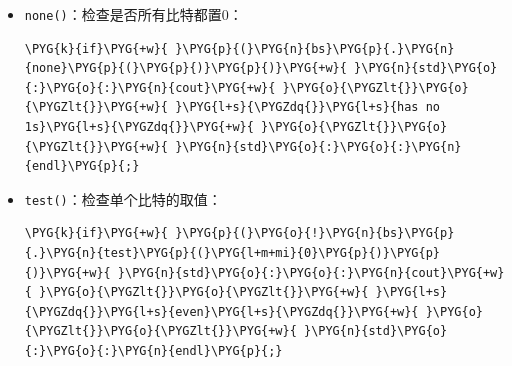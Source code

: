 \begin{itemize}
\begin{codeblockbg}
\begin{Verbatim}[commandchars=\\\{\},breaklines=true,breakanywhere=true,fontsize=\codefont,xleftmargin=17bp]
\PYG{k}{if}\PYG{+w}{ }\PYG{p}{(}\PYG{n}{bs}\PYG{p}{.}\PYG{n}{all}\PYG{p}{(}\PYG{p}{)}\PYG{p}{)}\PYG{+w}{ }\PYG{n}{std}\PYG{o}{:}\PYG{o}{:}\PYG{n}{cout}\PYG{+w}{ }\PYG{o}{\PYGZlt{}}\PYG{o}{\PYGZlt{}}\PYG{+w}{ }\PYG{l+s}{\PYGZdq{}}\PYG{l+s}{has only 1s}\PYG{l+s}{\PYGZdq{}}\PYG{+w}{ }\PYG{o}{\PYGZlt{}}\PYG{o}{\PYGZlt{}}\PYG{+w}{ }\PYG{n}{std}\PYG{o}{:}\PYG{o}{:}\PYG{n}{endl}\PYG{p}{;}
\end{Verbatim}
\end{codeblockbg}



\item \texttt{none()}：检查是否所有比特都置0：



\begin{codeblockbg}
\begin{Verbatim}[commandchars=\\\{\},breaklines=true,breakanywhere=true,fontsize=\codefont,xleftmargin=17bp]
\PYG{k}{if}\PYG{+w}{ }\PYG{p}{(}\PYG{n}{bs}\PYG{p}{.}\PYG{n}{none}\PYG{p}{(}\PYG{p}{)}\PYG{p}{)}\PYG{+w}{ }\PYG{n}{std}\PYG{o}{:}\PYG{o}{:}\PYG{n}{cout}\PYG{+w}{ }\PYG{o}{\PYGZlt{}}\PYG{o}{\PYGZlt{}}\PYG{+w}{ }\PYG{l+s}{\PYGZdq{}}\PYG{l+s}{has no 1s}\PYG{l+s}{\PYGZdq{}}\PYG{+w}{ }\PYG{o}{\PYGZlt{}}\PYG{o}{\PYGZlt{}}\PYG{+w}{ }\PYG{n}{std}\PYG{o}{:}\PYG{o}{:}\PYG{n}{endl}\PYG{p}{;}
\end{Verbatim}
\end{codeblockbg}



\item \texttt{test()}：检查单个比特的取值：



\begin{codeblockbg}
\begin{Verbatim}[commandchars=\\\{\},breaklines=true,breakanywhere=true,fontsize=\codefont,xleftmargin=17bp]
\PYG{k}{if}\PYG{+w}{ }\PYG{p}{(}\PYG{o}{!}\PYG{n}{bs}\PYG{p}{.}\PYG{n}{test}\PYG{p}{(}\PYG{l+m+mi}{0}\PYG{p}{)}\PYG{p}{)}\PYG{+w}{ }\PYG{n}{std}\PYG{o}{:}\PYG{o}{:}\PYG{n}{cout}\PYG{+w}{ }\PYG{o}{\PYGZlt{}}\PYG{o}{\PYGZlt{}}\PYG{+w}{ }\PYG{l+s}{\PYGZdq{}}\PYG{l+s}{even}\PYG{l+s}{\PYGZdq{}}\PYG{+w}{ }\PYG{o}{\PYGZlt{}}\PYG{o}{\PYGZlt{}}\PYG{+w}{ }\PYG{n}{std}\PYG{o}{:}\PYG{o}{:}\PYG{n}{endl}\PYG{p}{;}
\end{Verbatim}
\end{codeblockbg}



\end{itemize}
